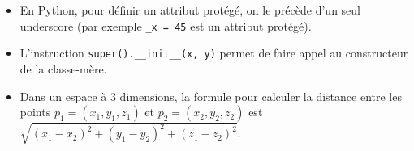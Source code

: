 \begin{Exercice}[15 minutes]
    \begin{conseil}
        \begin{itemize}
            \item En Python, pour définir un attribut protégé, on le précède d'un seul underscore (par exemple \lstinline{_x = 45} est un attribut protégé).
            \item L'instruction \lstinline{super().__init__(x, y)} permet de faire appel au constructeur de la classe-mère.
            \item Dans un espace à 3 dimensions, la formule pour calculer la distance entre les points $p_1 = (x_1, y_1, z_1)$ et $p_2 = (x_2, y_2, z_2)$ est $\sqrt{(x_1 - x_2)^2 + (y_1 - y_2)^2 + (z_1 - z_2)^2}$.
        \end{itemize}
    \end{conseil}
    \begin{solution}
     
    \end{solution}
	\begin{solution}
     
    \end{solution}
    \end{Exercice} 

